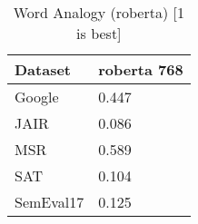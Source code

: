 \begin{table}[]
\centering
\begin{tabular}{l|l}
\hline
Dataset & roberta 768 \\
\hline
Google & 0.447 \\ 
JAIR & 0.086 \\ 
MSR & 0.589 \\ 
SAT & 0.104 \\ 
SemEval17 & 0.125
\end{tabular}
\caption{Word Analogy (roberta) [1 is best]}
\label{tab:analogy-roberta}
\end{table}
